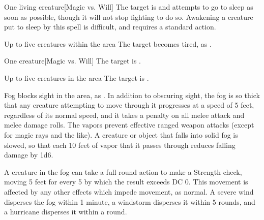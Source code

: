 \spellrng{\rngmed}
\spelldur{\durshort}
\begin{spelltarget}{One living creature}[Magic vs. Will]
    \spellsuccess The target is \fatigued and attempts to go to sleep as soon as possible, though it will not stop fighting to do so. Awakening a creature put to sleep by this spell is difficult, and requires a standard action.
\end{spelltarget}

\spelldur{\durshort}
\begin{spelltargets}{Up to five creatures within the area}
    \spellsuccess The target becomes tired, as .
\end{spelltargets}

\spellrng{\rngmed}
\spelldur{\durshort}
\begin{spelltarget}{One creature}[Magic vs. Will]
    \spellsuccess The target is \slowed.
\end{spelltarget}

\spelldur{\durshort}
\begin{spelltargets}{Up to five creatures in the area}
    \spelleffect The target is \slowed.
\end{spelltargets}

\spelldur{\durshort}
\spellline
\spelleffect Fog blocks sight in the area, as . In addition to obscuring sight, the fog is so thick that any creature attempting to move through it progresses at a speed of 5 feet, regardless of its normal speed, and it takes a  penalty on all melee attack and melee damage rolls. The vapors prevent effective ranged weapon attacks (except for magic rays and the like). A creature or object that falls into solid fog is slowed, so that each 10 feet of vapor that it passes through reduces falling damage by 1d6.
\par A creature in the fog can take a full-round action to make a Strength check, moving 5 feet for every 5 by which the result exceeds DC 0. This movement is affected by any other effects which impede movement, as normal.
\spellnotes \fogspellnotes A severe wind disperses the fog within 1 minute, a windstorm disperses it within 5 rounds, and a hurricane disperses it within a round.

